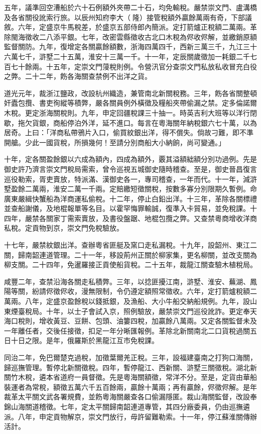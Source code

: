 \begin{pinyinscope}
五年，議準回空漕船於六十石例額外夾帶二十石，均免輸稅。嚴禁崇文門、盧溝橋及各省關役訛索行旅。以辰州知府李大（隆）接管稅額外贏餘萬兩有奇，下部議敘。六年，定盛京牛馬稅差，於盛京五部侍郎內簡派。定打箭爐正稅額二萬兩。革除閩海徵收二八添平銀。七年，改密雲縣徵收古北口木稅為侭收侭解，並繳銷原額監督關防。九年，復增定各關贏餘額數，浙海四萬四千，西新三萬三千，九江三十六萬七千，滸墅二十五萬，淮安十三萬一千。十一年，定辰關歲徵加一耗銀二千七百七十餘兩。十五年，定崇文門蓡稅則例。令營汛官分查崇文門私放私收冒充白役之弊。二十二年，飭各海關查禁例不出洋之貨。

道光元年，裁浙江鹽政，改設杭州織造，兼管南北新關稅務。三年，飭各省關整頓奸蠹包攬、書吏徇縱等積弊，嚴各關員例外橫徵及糧船夾帶偷漏之禁。定多倫諾爾木稅。更定浙海關稅則。九年，申定回疆稅課三十抽一。時英吉利大班等以洋行閉歇，拖欠貨銀，商船停泊外洋，延不進口。每言在粵海關年納稅銀六七十萬，以為居奇。上曰：「洋商私帶鴉片入口，偷買紋銀出洋，得不償失。倘故刁難，即不準開艙。少此一國貨稅，所損幾何！至請分別商船大小納餉，尚可變通。」

十年，定各關盈餘銀以六成為額內，四成為額外，覈其溢額絀額分別功過例。先是御史許乃濟言崇文門稅局需索，曾令巡視五城御史隨時稽查。至是，御史晉昌復言巡役勒索，胥吏賣放，特派滿、漢御史各一，專司稽查，一年而代。十一年，減滸墅盈餘二萬兩，淮安二萬一千兩。定賠繳短徵關稅，按數多寡分別限期久暫例。命廣東嚴緝快蟹船為洋商運私偷稅。十二年，停止白鉛出洋。十三年，革除各關標禮並查船謝儀，及地棍報單等名目。以霍罕悔罪輸誠，復準入卡貿易，並免稅課。十四年，嚴禁各關家丁需索賣放，及書役盤踞、地棍包攬之弊。又查禁粵商增收洋商私稅。定貢物到京，崇文門免稅驗放。

十七年，嚴禁紋銀出洋。查辦粵省匪艇及窯口走私漏稅。十九年，設韶州、東江二關，歸南韶連道管理。二十一年，移設荊州正關於柳家集，更名柳關，並改支關為柳支關。二十四年，免暹羅接正貢使船貨稅。二十五年，裁龍江關查驗木植稅局。

咸豐二年，查禁沿海各關走私積弊。三年，以捻匪擾江南，滸墅、淮安、蕪湖、鳳陽等關，紛請侭徵侭收，漫無限制，令仍遵定額照常徵收。六年，定打箭爐稅額二萬兩。八年，定盛京盈餘稅以錢抵銀，及漁船、大小牛船交納船規例。九年，設山東煙臺稅局。十年，以士子會試入京，照例驗放，嚴禁崇文門巡役訛詐。更定奉天海口稅則，增收黃豆、豆餅、包頭、油簍四稅，加贏餘八萬兩。又定各關監督未及一年離任者，交後任接徵，扣足一年分晰匯報例。革除北新關南北二口貨稅過關五日十日之限。是年，俄羅斯於黑龍江互市免稅課。

同治二年，免巴爾楚克過稅，加徵葉爾羌正稅。三年，設福建臺南之打狗口海關，歸巡撫管理。暫停北新關徵稅。四年，暫停龍江、西新關、滸墅三關徵稅。湖北新關竹木稅，遴本省道府一員督徵。先是粵海關額徵，常洋不分。至是，定貨由華船裝運者為常稅，額徵五萬六千五百餘兩，贏餘十萬兩；再有贏餘，侭徵侭解。是年裁革太平關文武各署規費，並飭粵海關嚴查各口偷漏隱匿。裁山海關監督，改設奉錦山海關道稽徵。七年，定太平關歸南韶連道專管，其四分廠委員，仍由巡撫遴派。八年，申定貢物解京，崇文門放行，毋許留難勒索。十一年，停江蘇淮關傳辦活計。


\end{pinyinscope}

